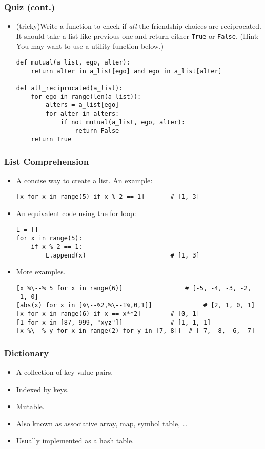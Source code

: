\documentclass{beamer}
\begin{document}
\begin{frame}[fragile]
\frametitle{Quiz (cont.)}
\begin{itemize}
\item (tricky)Write a function to check
      if \emph{all} the friendship choices are
      reciprocated. It should take a 
      list like previous one and return either 
      \lstinline{True} or \lstinline{False}.
      (Hint: You may want to use a utility
       function below.)
\begin{lstlisting}
def mutual(a_list, ego, alter):
    return alter in a_list[ego] and ego in a_list[alter]

def all_reciprocated(a_list):
    for ego in range(len(a_list)):
        alters = a_list[ego]
        for alter in alters:
            if not mutual(a_list, ego, alter):
                return False 
    return True
\end{lstlisting}
\end{itemize}
\end{frame}
 
\begin{frame}[fragile]
\frametitle{List Comprehension}
\begin{itemize}
\item A concise way to create a list. An example:
\begin{lstlisting}
[x for x in range(5) if x % 2 == 1]       # [1, 3]
\end{lstlisting}
\item An equivalent code using the for loop:
\begin{lstlisting}
L = []
for x in range(5):
    if x % 2 == 1:
        L.append(x)                       # [1, 3]
\end{lstlisting}
\item More examples.
\begin{lstlisting}[escapechar=\%]
[x %\--% 5 for x in range(6)]                 # [-5, -4, -3, -2, -1, 0]
[abs(x) for x in [%\--%2,%\--1%,0,1]]              # [2, 1, 0, 1]
[x for x in range(6) if x == x**2]        # [0, 1]
[1 for x in [87, 999, "xyz"]]             # [1, 1, 1]
[x %\--% y for x in range(2) for y in [7, 8]]  # [-7, -8, -6, -7]
\end{lstlisting}
\end{itemize}
\end{frame}
 
\begin{frame}[fragile]
\frametitle{Dictionary}
\begin{itemize}
\item<1-> A collection of key-value pairs.
\item<1-> Indexed by keys.
\item<1-> Mutable.
\item<2-> Also known as associative array, map,
      symbol table, \ldots
\item<2-> Usually implemented as a hash table.
\end{itemize}
\end{frame}
 
\end{document}
